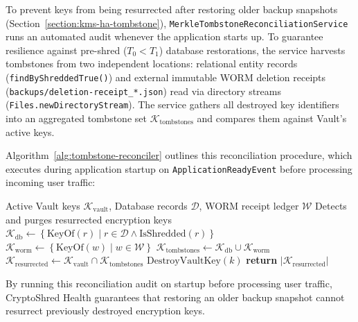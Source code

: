 To prevent keys from being resurrected after restoring older backup snapshots (Section~\ref{section:kms-ha-tombstone}), \texttt{MerkleTombstoneReconciliationService} runs an automated audit whenever the application starts up. To guarantee resilience against pre-shred ($T_0 < T_1$) database restorations, the service harvests tombstones from two independent locations: relational entity records (\texttt{findByShreddedTrue()}) and external immutable WORM deletion receipts (\texttt{backups/deletion-receipt\_*.json}) read via directory streams (\texttt{Files.newDirectoryStream}). The service gathers all destroyed key identifiers into an aggregated tombstone set $\mathcal{K}_{\text{tombstones}}$ and compares them against Vault's active keys.

Algorithm~\ref{alg:tombstone-reconciler} outlines this reconciliation procedure, which executes during application startup on \texttt{ApplicationReadyEvent} before processing incoming user traffic:

\begin{algorithm}[H]
\caption{Merkle Tombstone Reconciliation and Key Purge}\label{alg:tombstone-reconciler}
\begin{algorithmic}[1]
\Require Active Vault keys $\mathcal{K}_{\text{vault}}$, Database records $\mathcal{D}$, WORM receipt ledger $\mathcal{W}$
\Ensure Detects and purges resurrected encryption keys
\State $\mathcal{K}_{\text{db}} \gets \left\{ \text{KeyOf}(r) \mid r \in \mathcal{D} \land \text{IsShredded}(r) \right\}$ 
\State $\mathcal{K}_{\text{worm}} \gets \left\{ \text{KeyOf}(w) \mid w \in \mathcal{W} \right\}$ 
\State $\mathcal{K}_{\text{tombstones}} \gets \mathcal{K}_{\text{db}} \cup \mathcal{K}_{\text{worm}}$ 
\State $\mathcal{K}_{\text{resurrected}} \gets \mathcal{K}_{\text{vault}} \cap \mathcal{K}_{\text{tombstones}}$ 
    \State $\text{DestroyVaultKey}(k)$ 
\EndFor
\State \textbf{return} $|\mathcal{K}_{\text{resurrected}}|$ 
\end{algorithmic}
\end{algorithm}

By running this reconciliation audit on startup before processing user traffic, CryptoShred Health guarantees that restoring an older backup snapshot cannot resurrect previously destroyed encryption keys.

